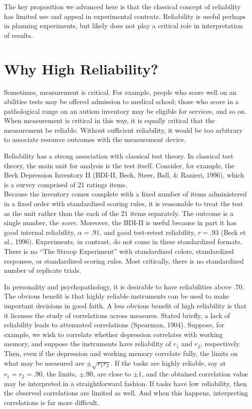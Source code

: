 \documentclass[
  ,man]{apa6}
\begin{document}
The key proposition we advanced here is that the classical concept of reliability has limited use and appeal in experimental contexts. Reliability is useful perhaps in planning experiments, but likely does not play a critical role in interpretation of results.

\section{Why High Reliability?}\label{why-high-reliability}

Sometimes, measurement is critical. For example, people who score well on an abilities tests may be offered admission to medical school; those who score in a pathological range on an autism inventory may be eligible for services, and so on. When measurement is critical in this way, it is equally critical that the measurement be reliable. Without sufficient reliability, it would be too arbitrary to associate resource outcomes with the measurement device.

Reliability has a strong association with classical test theory. In classical test theory, the main unit for analysis is the test itself. Consider, for example, the Beck Depression Inventory II (BDI-II, Beck, Steer, Ball, \& Ranieri, 1996), which is a survey comprised of 21 ratings items.\\
Because the inventory comes complete with a fixed number of items administered in a fixed order with standardized scoring rules, it is reasonable to treat the test as the unit rather than the each of the 21 items separately. The outcome is a single number, the \emph{score.} Moreover, the BDI-II is useful because in part it has good internal reliability, \(\alpha = .91\), and good test-retest reliability, \(r=.93\) (Beck et al., 1996). Experiments, in contrast, do not come in these standardized formats. There is no ``The Stroop Experiment'' with standardized colors, standardized responses, or standardized scoring rules. Most critically, there is no standardized number of replicate trials.

In personality and psychopathology, it is desirable to have reliabilities above .70. The obvious benefit is that highly reliable instruments can be used to make important decisions in good faith. A less obvious benefit of high reliability is that it licenses the study of correlations across measures. Stated briefly, a lack of reliability leads to attenuated correlations (Spearman, 1904). Suppose, for example, we wish to correlate whether depression correlates with working memory, and suppose the instruments have reliability of \(r_1\) and \(r_2\), respectively. Then, even if the depression and working memory correlate fully, the limits on what may be measured are \(\pm \sqrt{r_1r_2}\). If the tasks are highly reliable, say at \(r_1=r_2=.90\), the limits, \(\pm.90\), are close to \(\pm 1\), and the obtained correlation value may be interpreted in a straightforward fashion. If tasks have low reliability, then the observed correlations are limited as well. And when this happens, interpreting correlations is far more difficult.
\end{document}

